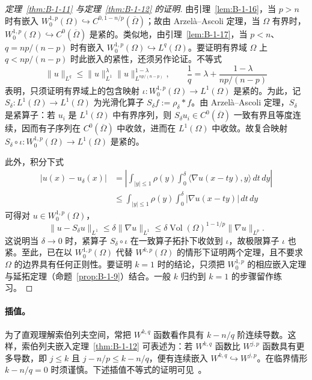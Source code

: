 \begin{proof}[定理~\ref{thm:B-1-11} 与定理~\ref{thm:B-1-12} 的证明]
由引理~\ref{lem:B-1-16}，当 $p>n$ 时有嵌入 $W_0^{1,p}(\Omega)\hookrightarrow C^{0,1-n/p}(\overline\Omega)$；故由 Arzelà--Ascoli 定理，当 $\Omega$ 有界时，$W_0^{1,p}(\Omega)\hookrightarrow C^0(\overline\Omega)$ 是紧的。类似地，由引理~\ref{lem:B-1-17}，当 $p<n$、$q=np/(n-p)$ 时有嵌入 $W_0^{1,p}(\Omega)\hookrightarrow L^q(\Omega)$。要证明有界域 $\Omega$ 上 $q<np/(n-p)$ 时此嵌入的紧性，还须另作论证。不等式
\[
\|u\|_{L^q}\le\|u\|_{L^1}^\lambda
\|u\|_{L^{np/(n-p)}}^{1-\lambda},
\qquad\frac1q=\lambda+\frac{1-\lambda}{np/(n-p)}
\]
表明，只须证明有界域上的包含映射 $\iota:W_0^{1,p}(\Omega)\to L^1(\Omega)$ 是紧的。为此，记 $S_\delta:L^1(\Omega)\to L^1(\Omega)$ 为光滑化算子 $S_\delta f:=\rho_\delta*f$。由 Arzelà--Ascoli 定理，$S_\delta$ 是紧算子：若 $u_i$ 是 $L^1(\Omega)$ 中有界序列，则 $S_\delta u_i\in C^0(\overline\Omega)$ 一致有界且等度连续，因而有子序列在 $C^0(\overline\Omega)$ 中收敛，进而在 $L^1(\Omega)$ 中收敛。故复合映射 $S_\delta\circ\iota:W_0^{1,p}(\Omega)\to L^1(\Omega)$ 是紧的。

此外，积分下式
\begin{align*}
|u(x)-u_\delta(x)|
&=\left|\int_{|y|\le1}\rho(y)\int_0^\delta
\langle\nabla u(x-ty),y\rangle\,dt\,dy\right|\\
&\le\int_{|y|\le1}\rho(y)\int_0^\delta
|\nabla u(x-ty)|\,dt\,dy
\end{align*}
可得对 $u\in W_0^{1,p}(\Omega)$，
\[
\|u-S_\delta u\|_{L^1}\le\delta\|\nabla u\|_{L^1}
\le\delta\operatorname{Vol}(\Omega)^{1-1/p}\|\nabla u\|_{L^p}.
\]
这说明当 $\delta\to0$ 时，紧算子 $S_\delta\circ\iota$ 在一致算子拓扑下收敛到 $\iota$，故极限算子 $\iota$ 也紧。至此，已在以 $W_0^{1,p}(\Omega)$ 代替 $W^{k,p}(\Omega)$ 的情形下证明两个定理，且不要求 $\Omega$ 的边界具有任何正则性。要证明 $k=1$ 时的结论，只须把 $W_0^{1,p}$ 的相应嵌入定理与延拓定理（命题~\ref{prop:B-1-9}）结合。一般 $k$ 归约到 $k=1$ 的步骤留作练习。
\end{proof}

\paragraph{插值。} 为了直观理解索伯列夫空间，常把 $W^{k,q}$ 函数看作具有 $k-n/q$ 阶连续导数。这样，索伯列夫嵌入定理~\ref{thm:B-1-12} 可表述为：若 $W^{k,q}$ 函数比 $W^{j,p}$ 函数具有更多导数，即 $j\le k$ 且 $j-n/p\le k-n/q$，便有连续嵌入 $W^{k,q}\hookrightarrow W^{j,p}$。在临界情形 $k-n/q=0$ 时须谨慎。下述插值不等式的证明可见~。

